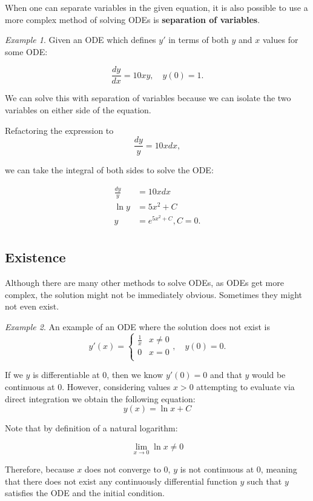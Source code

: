 \documentclass{article}
\theoremstyle{remark}
\newtheorem{example}{Example}
\begin{document}
When one can separate variables in the given equation, it is also possible to use a more complex method of solving ODEs is \textbf{separation of variables}. 

\begin{example}
Given an ODE which defines $y'$ in terms of both $y$ and $x$ values for some ODE:

$$ \frac{dy}{dx} = 10xy, \quad y(0) = 1.$$

We can solve this with separation of variables because we can isolate the two variables on either side of the equation. 

Refactoring the expression to
$$  \frac{dy}{y} = 10xdx,$$

we can take the integral of both sides to solve the ODE:

\begin{align*}
\frac{dy}{y} &= 10xdx\\
\ln y  &= 5x^2 + C\\
y &= e^{5x^2 + C}, C=0.\\
\end{align*}
\end{example}

\subsection{Existence}
Although there are many other methods to solve ODEs, as ODEs get more complex, the solution might not be immediately obvious. Sometimes they might not even exist. 

\begin{example}
An example of an ODE where the solution does not exist is 
$$ y'(x) = \begin{cases} 
      \frac{1}{x} & x \neq 0 \\
      0 & x= 0 \\
   \end{cases} , \quad y(0) = 0.$$

If we $y$ is differentiable at 0, then we know  $y'(0) = 0$ and that $y$ would be continuous at 0. However, considering values $x > 0$ attempting to evaluate via direct integration we obtain the following equation:
$$y(x) = \ln x +C$$

Note that by definition of a natural logarithm:

$$\lim_{x \to 0} \ln x \neq 0$$

Therefore, because $x$ does not converge to 0, $y$ is not continuous at 0, meaning that there does not exist any continuously differential function $y$ such that $y$ satisfies the ODE and the initial condition. 
\end{example}
\end{document}
